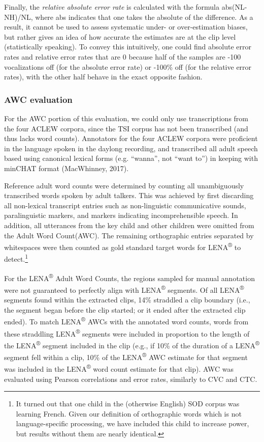 \documentclass[english,table,man,floatsintext]{apa6}
\let\rmarkdownfootnote\footnote%
\def\footnote{\protect\rmarkdownfootnote}
\begin{document}
Finally, the \emph{relative absolute error rate} is calculated with the
formula abs(NL-NH)/NL, where abs indicates that one takes the absolute
of the difference. As a result, it cannot be used to assess systematic
under- or over-estimation biases, but rather gives an idea of how
accurate the estimates are at the clip level (statistically speaking).
To convey this intuitively, one could find absolute error rates and
relative error rates that are 0 because half of the samples are -100
vocalizations off (for the absolute error rate) or -100\% off (for the
relative error rates), with the other half behave in the exact opposite
fashion.

\subsubsection{AWC evaluation}\label{awc-evaluation}

For the AWC portion of this evaluation, we could only use transcriptions
from the four ACLEW corpora, since the TSI corpus has not been
transcribed (and thus lacks word counts). Annotators for the four ACLEW
corpora were proficient in the language spoken in the daylong recording,
and transcribed all adult speech based using canonical lexical forms
(e.g. \enquote{wanna}, not \enquote{want to}) in keeping with minCHAT
format (MacWhinney, 2017).

Reference adult word counts were determined by counting all
unambiguously transcribed words spoken by adult talkers. This was
achieved by first discarding all non-lexical transcript entries such as
non-linguistic communicative sounds, paralinguistic markers, and markers
indicating incomprehensible speech. In addition, all utterances from the
key child and other children were omitted from the Adult Word
Count(AWC). The remaining orthographic entries separated by whitespaces
were then counted as gold standard target words for
LENA\textsuperscript{®} to
detect.\footnote{It turned out that one child in the (otherwise English) SOD corpus was learning French. Given our definition of orthographic words which is not language-specific processing, we have included this child to increase power, but results without them are nearly identical.}

For the LENA\textsuperscript{®} Adult Word Counts, the regions sampled
for manual annotation were not guaranteed to perfectly align with
LENA\textsuperscript{®} segments. Of all LENA\textsuperscript{®}
segments found within the extracted clips, 14\% straddled a clip
boundary (i.e., the segment began before the clip started; or it ended
after the extracted clip ended). To match LENA\textsuperscript{®} AWCs
with the annotated word counts, words from these straddling
LENA\textsuperscript{®} segments were included in proportion to the
length of the LENA\textsuperscript{®} segment included in the clip
(e.g., if 10\% of the duration of a LENA\textsuperscript{®} segment fell
within a clip, 10\% of the LENA\textsuperscript{®} AWC estimate for that
segment was included in the LENA\textsuperscript{®} word count estimate
for that clip). AWC was evaluated using Pearson correlations and error
rates, similarly to CVC and CTC.
\end{document}
